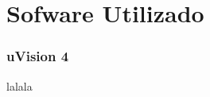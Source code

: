 \section{Sofware Utilizado} %
\label{sec:sofware_utilizado}


\subsubsection{uVision 4} %
\label{ssub:uvision_4}

lalala



\clearpage


